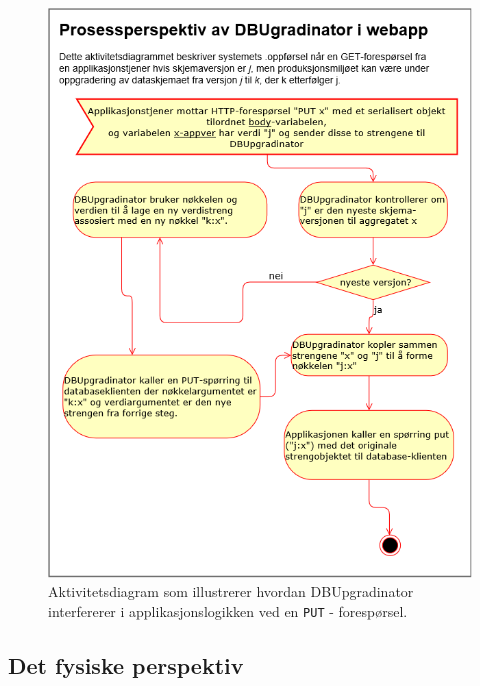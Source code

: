 \begin{figure}[!ht]
    \centering
    \includegraphics[scale=0.6]{fig/dbupgradinator-prosess-3.png}
    \caption{Aktivitetsdiagram som illustrerer hvordan DBUpgradinator interfererer i applikasjonslogikken ved en \texttt{PUT} - forespørsel.}
    \label{fig9}
\end{figure}

\newpage

\subsection{Det fysiske perspektiv}

